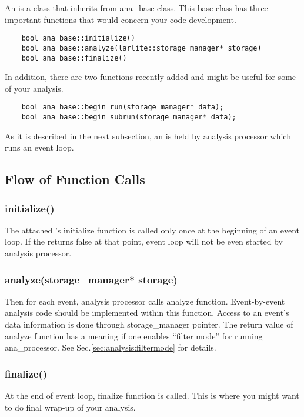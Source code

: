 
An \anaunit is a \CPP class that inherits from {\ttfamily ana\_base} class. 
This base class has three important functions that would concern your \anaunit code development.
\begin{lstlisting}
    bool ana_base::initialize()
    bool ana_base::analyze(larlite::storage_manager* storage)
    bool ana_base::finalize()
\end{lstlisting}
In addition, there are two functions recently added and might be useful for some of your analysis.
\begin{lstlisting}
    bool ana_base::begin_run(storage_manager* data);
    bool ana_base::begin_subrun(storage_manager* data);
\end{lstlisting}
As it is described in the next subsection, an \anaunit is held by analysis processor which runs an event loop.

\subsection{Flow of Function Calls}

\subsubsection{{\ttfamily initialize()}}
The attached \anaunit's {\ttfamily initialize} function is called only once at the beginning of an event loop. 
If the \anaunit returns {\ttfamily false} at that point, event loop will not be even started by analysis processor.

\subsubsection{{\ttfamily analyze(storage\_manager* storage)}}
Then for each event, analysis processor calls {\ttfamily analyze} function. Event-by-event analysis code should be implemented within this function. Access to an event's data information is done through {\ttfamily storage\_manager} pointer. The return value of {\ttfamily analyze} function has a meaning if one enables ``filter mode'' for running {\ttfamily ana\_processor}. See Sec.\ref{sec:analysis:filtermode} for details.

\subsubsection{{\ttfamily finalize()}}
At the end of event loop, {\ttfamily finalize} function is called. This is where you might want to do final wrap-up of your analysis.

